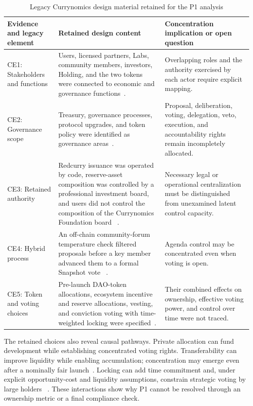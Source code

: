 \documentclass[referee,sn-basic]{sn-jnl}
\begin{document}
\begin{table}[!b]
\caption{Legacy Currynomics design material retained for the P1 analysis}
\label{tab:legacy-p1}
\centering
\small
\begin{tabularx}{\linewidth}{@{}p{.20\linewidth}X X@{}}
\toprule
Evidence and legacy element & Retained design content & Concentration implication or open question \\
\midrule
CE1: Stakeholders and functions & Users, licensed partners, Labs, community members,
investors, Holding, and the two tokens were connected to economic and governance
functions~\citep[pp.~28--30, 34--35]{Kivilo2023TokenEconomy}. & Overlapping roles and the authority exercised by each actor require
explicit mapping. \\
CE2: Governance scope & Treasury, governance processes, protocol upgrades, and token
policy were identified as governance areas~\citep[pp.~47--48]{Kivilo2023TokenEconomy}. & Proposal, deliberation, voting,
delegation, veto, execution, and accountability rights remain incompletely allocated. \\
CE3: Retained authority & Redcurry issuance was operated by code, reserve-asset
composition was controlled by a professional investment board, and users did not
control the composition of the Currynomics Foundation board
~\citep[pp.~50--51]{Kivilo2023TokenEconomy}. & Necessary legal or operational centralization must be distinguished from
unexamined latent control capacity. \\
CE4: Hybrid process & An off-chain community-forum temperature check filtered
proposals before a key member advanced them to a formal Snapshot vote
~\citep[pp.~52--53]{Kivilo2023TokenEconomy}. & Agenda control may be concentrated even when voting is open. \\
CE5: Token and voting choices & Pre-launch DAO-token allocations, ecosystem
incentive and reserve allocations, vesting, and conviction voting with time-weighted
locking were specified~\citep[p.~58, pp.~66--72]{Kivilo2023TokenEconomy}. & Their combined effects on ownership, effective voting power, and
control over time were not traced. \\
\bottomrule
\end{tabularx}
\end{table}

The retained choices also reveal causal pathways. Private allocation can fund
development while establishing concentrated voting rights. Transferability can
improve liquidity while enabling accumulation; concentration may emerge even
after a nominally fair launch~\cite{DelgadoFernandez2024FairLaunch}. Locking can
add time commitment and, under explicit opportunity-cost and liquidity
assumptions, constrain strategic voting by large holders
~\cite{Mohan2022,Han2026DAOGovernance}. These interactions show why
P1 cannot be resolved through an ownership metric or a final compliance check.
\end{document}
